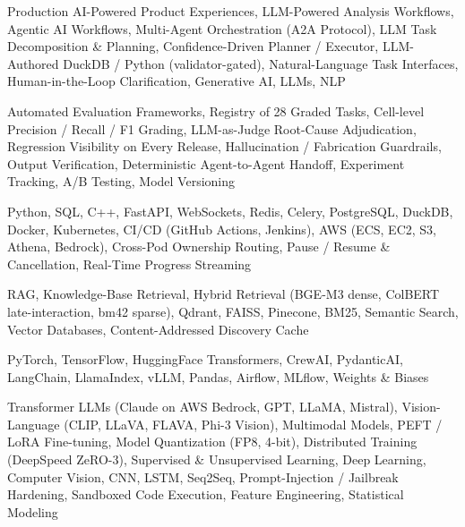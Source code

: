 \documentclass[letter,10pt]{article}
\begin{document}
 Production AI-Powered Product Experiences, LLM-Powered Analysis Workflows, Agentic AI Workflows, Multi-Agent Orchestration (A2A Protocol), LLM Task Decomposition \& Planning, Confidence-Driven Planner / Executor, LLM-Authored DuckDB / Python (validator-gated), Natural-Language Task Interfaces, Human-in-the-Loop Clarification, Generative AI, LLMs, NLP\par\vspace{2pt}

 Automated Evaluation Frameworks, Registry of 28 Graded Tasks, Cell-level Precision / Recall / F1 Grading, LLM-as-Judge Root-Cause Adjudication, Regression Visibility on Every Release, Hallucination / Fabrication Guardrails, Output Verification, Deterministic Agent-to-Agent Handoff, Experiment Tracking, A/B Testing, Model Versioning\par\vspace{2pt}

 Python, SQL, C++, FastAPI, WebSockets, Redis, Celery, PostgreSQL, DuckDB, Docker, Kubernetes, CI/CD (GitHub Actions, Jenkins), AWS (ECS, EC2, S3, Athena, Bedrock), Cross-Pod Ownership Routing, Pause / Resume \& Cancellation, Real-Time Progress Streaming\par\vspace{2pt}

 RAG, Knowledge-Base Retrieval, Hybrid Retrieval (BGE-M3 dense, ColBERT late-interaction, bm42 sparse), Qdrant, FAISS, Pinecone, BM25, Semantic Search, Vector Databases, Content-Addressed Discovery Cache\par\vspace{2pt}

 PyTorch, TensorFlow, HuggingFace Transformers, CrewAI, PydanticAI, LangChain, LlamaIndex, vLLM, Pandas, Airflow, MLflow, Weights \& Biases\par\vspace{2pt}

 Transformer LLMs (Claude on AWS Bedrock, GPT, LLaMA, Mistral), Vision-Language (CLIP, LLaVA, FLAVA, Phi-3 Vision), Multimodal Models, PEFT / LoRA Fine-tuning, Model Quantization (FP8, 4-bit), Distributed Training (DeepSpeed ZeRO-3), Supervised \& Unsupervised Learning, Deep Learning, Computer Vision, CNN, LSTM, Seq2Seq, Prompt-Injection / Jailbreak Hardening, Sandboxed Code Execution, Feature Engineering, Statistical Modeling
\end{document}
